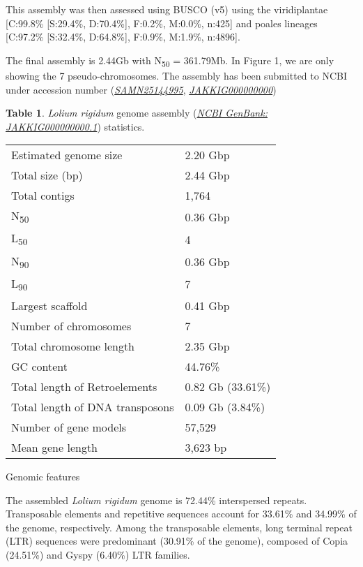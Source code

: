 This assembly was then assessed using BUSCO (v5) using the viridiplantae
{[}C:99.8\% {[}S:29.4\%, D:70.4\%{]}, F:0.2\%, M:0.0\%, n:425{]} and
poales lineages {[}C:97.2\% {[}S:32.4\%, D:64.8\%{]}, F:0.9\%, M:1.9\%,
n:4896{]}.

The final assembly is 2.44Gb with N\textsubscript{50} = 361.79Mb. In
Figure 1, we are only showing the 7 pseudo-chromosomes. The assembly has
been submitted to NCBI under accession number
(\href{https://www.ncbi.nlm.nih.gov/biosample/SAMN25144995}{\emph{SAMN25144995}},
\href{https://www.ncbi.nlm.nih.gov/nuccore/2206643664\#sequence_JAKKIG000000000.1}{\emph{JAKKIG000000000}})

\textbf{Table 1}. \emph{Lolium rigidum} genome assembly
(\href{https://www.ncbi.nlm.nih.gov/nuccore/2206643664\#sequence_JAKKIG000000000.1}{\emph{NCBI
GenBank: JAKKIG000000000.1}}) statistics.

\begin{longtable}[]{@{}ll@{}}
\toprule
& \\
\midrule
\endhead
Estimated genome size & 2.20 Gbp \\
Total size (bp) & 2.44 Gbp \\
Total contigs & 1,764 \\
N\textsubscript{50} & 0.36 Gbp \\
L\textsubscript{50} & 4 \\
N\textsubscript{90} & 0.36 Gbp \\
L\textsubscript{90} & 7 \\
Largest scaffold & 0.41 Gbp \\
Number of chromosomes & 7 \\
Total chromosome length & 2.35 Gbp \\
GC content & 44.76\% \\
Total length of Retroelements & 0.82 Gb (33.61\%) \\
Total length of DNA transposons & 0.09 Gb (3.84\%) \\
Number of gene models & 57,529 \\
Mean gene length & 3,623 bp \\
\bottomrule
\end{longtable}

\protect\hypertarget{anchor-15}{}{}Genomic features

The assembled \emph{Lolium rigidum} genome is 72.44\% interspersed
repeats. Transposable elements and repetitive sequences account for
33.61\% and 34.99\% of the genome, respectively. Among the transposable
elements, long terminal repeat (LTR) sequences were predominant (30.91\%
of the genome), composed of Copia (24.51\%) and Gyspy (6.40\%) LTR
families.

